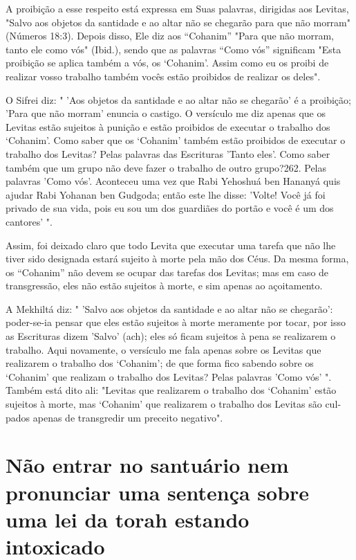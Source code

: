 A proibição a esse respeito está expressa em Suas palavras, dirigidas
aos Levitas, "Salvo aos objetos da santidade e ao altar não se chegarão
para que não morram" (Números 18:3). Depois disso, Ele diz aos ``Cohanim''
"Para que não morram, tanto ele como vós" (Ibid.), sendo que as palavras
``Como vós'' significam "Esta proibição se aplica também a vós, os
`Cohanim'. Assim como eu os proibi de realizar vosso trabalho também
vocês estão proibidos de reali­zar os deles".

O Sifrei diz: " 'Aos objetos da santidade e ao altar não se chegarão' é
a proibição; 'Para que não morram' enuncia o castigo. O versículo me diz
apenas que os Levitas estão sujeitos à punição e estão proibidos de
executar o trabalho dos `Cohanim'. Como saber que os `Cohanim' também
estão proibi­dos de executar o trabalho dos Levitas? Pelas palavras das
Escrituras 'Tanto eles'. Como saber também que um grupo não deve fazer o
trabalho de outro gru­po?262. Pelas palavras 'Como vós'. Aconteceu uma
vez que Rabi Yehoshuá ben Hananyá quis ajudar Rabi Yohanan ben Gudgoda;
então este lhe disse: 'Volte! Você já foi privado de sua vida, pois eu
sou um dos guardiães do portão e você é um dos cantores' ".

Assim, foi deixado claro que todo Levita que executar uma tarefa que não
lhe tiver sido designada estará sujeito à morte pela mão dos Céus. Da
mesma forma, os ``Cohanim'' não devem se ocupar das tarefas dos Levitas;
mas em caso de transgressão, eles não estão sujeitos à morte, e sim
apenas ao açoitamento.

A Mekhiltá diz: " 'Salvo aos objetos da santidade e ao altar não se
che­garão': poder-se-ia pensar que eles estão sujeitos à morte meramente
por tocar, por isso as Escrituras dizem 'Salvo' (ach); eles só ficam
sujeitos à pena se realiza­rem o trabalho. Aqui novamente, o versículo
me fala apenas sobre os Levitas que realizarem o trabalho dos `Cohanim';
de que forma fico sabendo sobre os
`Cohanim' que realizam o trabalho dos Levitas? Pelas palavras 'Como vós'
". Também está dito ali: "Levitas que realizarem o trabalho dos
`Cohanim' estão sujeitos à morte, mas `Cohanim' que realizarem o
trabalho dos Levitas são cul­pados apenas de transgredir um preceito
negativo".


\section{Não entrar no santuário nem pronunciar uma 
sentença sobre uma lei da torah estando intoxicado}

